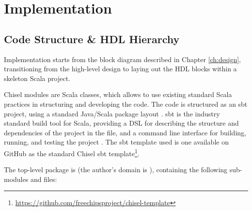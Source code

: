 \chapter{Implementation}
\label{ch:implementation}

\section{Code Structure \& HDL Hierarchy}
Implementation starts from the block diagram described in Chapter \ref{ch:design}, transitioning from the high-level design to laying out the HDL blocks within a skeleton Scala project.

Chisel modules are Scala classes, which allows to use existing standard Scala practices in structuring and developing the code. The code is structured as an sbt project, using a standard Java/Scala package layout \cite{scala_style}. sbt is the industry standard build tool for Scala, providing a DSL for describing the structure and dependencies of the project in the  file, and a command line interface for building, running, and testing the project \cite{sbt}. The sbt template used is one available on GitHub as the standard Chisel sbt template\footnote{\url{https://github.com/freechipsproject/chisel-template}}.

The top-level package is  (the author's domain is ), containing the following sub-modules and files:

